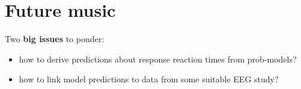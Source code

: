 \documentclass[fleqn,reqno,10pt]{article}
\newcommand{\den}[1]{\left [\! \left [ #1 \right ]\! \right]}
\newcommand{\red}[1]{{\color{Red}{#1}}}
\DeclareMathOperator{\expo}{exp}
\begin{document}
\section{Future music}

Two \textbf{big issues} to ponder:

\begin{itemize}
\item how to derive predictions about response reaction times from prob-models?
\item how to link model predictions to data from some suitable EEG study?
\end{itemize}






\printbibliography[heading=bibintoc]
\end{document}
